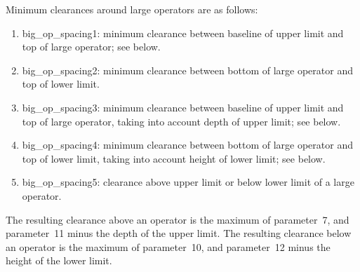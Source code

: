 Minimum clearances around large operators are as follows:
\begin{enumerate} %
\item big\_op\_spacing1:
minimum clearance between baseline of upper limit and top
of large operator; see below.
\item big\_op\_spacing2:
minimum clearance between bottom of large operator and top of 
lower limit.
\item big\_op\_spacing3:
minimum clearance between baseline of
upper limit and top of large operator,
taking into account depth of upper limit; see below.
\item big\_op\_spacing4:
minimum clearance between bottom of large operator and top of lower
limit, taking into account height of lower limit; see below.
\item big\_op\_spacing5:
clearance above upper limit or below lower limit of a large operator.
\end{enumerate}
The resulting clearance above an operator is the maximum
of parameter~7, and parameter~11 minus the depth of the
upper limit.
The resulting clearance below an operator is the maximum
of parameter~10, and parameter~12 minus the height of the
lower limit.


